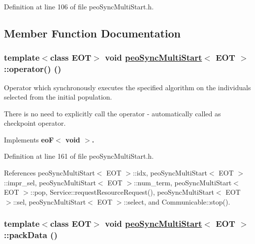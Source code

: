 Definition at line 106 of file peo\-Sync\-Multi\-Start.h.

\subsection{Member Function Documentation}
\hypertarget{classpeoSyncMultiStart_76385b33fe514f91cb83f0fbecbeb3c2}{
\subsubsection[operator()]{\setlength{\rightskip}{0pt plus 5cm}template$<$class EOT$>$ void \hyperlink{classpeoSyncMultiStart}{peo\-Sync\-Multi\-Start}$<$ EOT $>$::operator() ()}}
\label{classpeoSyncMultiStart_76385b33fe514f91cb83f0fbecbeb3c2}


Operator which synchronously executes the specified algorithm on the individuals selected from the initial population. 

There is no need to explicitly call the operator - automatically called as checkpoint operator. 

Implements \bf{eo\-F$<$ void $>$}.

Definition at line 161 of file peo\-Sync\-Multi\-Start.h.

References peo\-Sync\-Multi\-Start$<$ EOT $>$::idx, peo\-Sync\-Multi\-Start$<$ EOT $>$::impr\_\-sel, peo\-Sync\-Multi\-Start$<$ EOT $>$::num\_\-term, peo\-Sync\-Multi\-Start$<$ EOT $>$::pop, Service::request\-Resource\-Request(), peo\-Sync\-Multi\-Start$<$ EOT $>$::sel, peo\-Sync\-Multi\-Start$<$ EOT $>$::select, and Communicable::stop().\hypertarget{classpeoSyncMultiStart_8becfab1922b64708dca5a53e2932a5a}{
\subsubsection[packData]{\setlength{\rightskip}{0pt plus 5cm}template$<$class EOT$>$ void \hyperlink{classpeoSyncMultiStart}{peo\-Sync\-Multi\-Start}$<$ EOT $>$::pack\-Data ()}}
\label{classpeoSyncMultiStart_8becfab1922b64708dca5a53e2932a5a}



